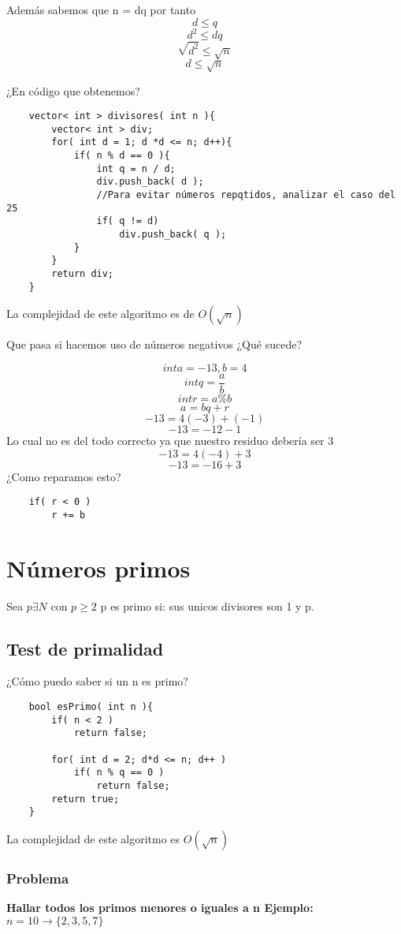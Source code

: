 Además sabemos que n = dq por tanto \newline
\[ d \leq q \]
\[ d^{2} \leq dq \]
\[ \sqrt{d^{2}} \leq \sqrt{n} \]
\[ d \leq \sqrt{n} \]

¿En código que obtenemos?

\begin{lstlisting}
    vector< int > divisores( int n ){
        vector< int > div;
        for( int d = 1; d *d <= n; d++){
            if( n % d == 0 ){
                int q = n / d;
                div.push_back( d );
                //Para evitar números repqtidos, analizar el caso del 25
                if( q != d)
                    div.push_back( q );
            }
        }
        return div;
    }
\end{lstlisting}

La complejidad de este algoritmo es de $O(\sqrt{n})$ \newline

Que pasa si hacemos uso de números negativos ¿Qué sucede?

\[ int a = -13, b = 4\]
\[ int q = \frac{a}{b} \]
\[ int r = a \% b \]
\[ a = bq + r\]
\[ -13 = 4(-3) + (-1)\]
\[ -13 = -12 - 1\]
Lo cual no es del todo correcto ya que nuestro residuo debería ser 3
\[ -13 = 4(-4) + 3\]
\[ -13 = -16 + 3\]
¿Como reparamos esto?
\begin{lstlisting}
    if( r < 0 )
        r += b
\end{lstlisting}

\section{Números primos}

Sea $p \exists N$ con $p \geq 2$ p es primo si: sus unicos divisores son 1 y p.

\subsection{Test de primalidad}
¿Cómo puedo saber si un n es primo?
\begin{lstlisting}
    bool esPrimo( int n ){
        if( n < 2 )
            return false;

        for( int d = 2; d*d <= n; d++ )
            if( n % q == 0 )
                return false;
        return true;
    }
\end{lstlisting}
La complejidad de este algoritmo es $O(\sqrt{n})$

\subsubsection{Problema}
\textbf{Hallar todos los primos menores o iguales a n \newline Ejemplo: }
$ n = 10 \rightarrow \{ 2, 3, 5, 7 \}$ \newline

